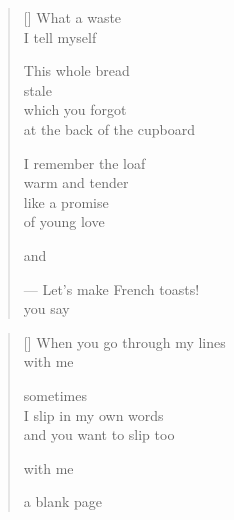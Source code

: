 \documentclass[12pt,a4paper]{article}
\begin{document}

\newpage

\poemtitle{}

\settowidth{\versewidth}{--- Let's make French toasts!}

\bigskip

\begin{verse}[\versewidth]
  What a waste \\
  I tell myself

  This whole bread \\
  stale \\
  which you forgot \\
  at the back of the cupboard

  I remember the loaf \\
  warm and tender \\
  like a promise \\
  of young love

  and

  --- Let's make French toasts! \\
  you say
\end{verse}


\newpage

\poemtitle{}

\settowidth{\versewidth}{When you go through my lines}

\bigskip

\begin{verse}[\versewidth]
  When you go through my lines \\
  with me

  sometimes \\
  I slip in my own words \\
  and you want to slip too

  with me

  a blank page
\end{verse}


\newpage

\poemtitle{}

\settowidth{\versewidth}{like that afternoon}

\bigskip
\end{document}
